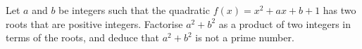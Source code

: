 Let $a$ and $b$ be integers such that the quadratic $f(x)=x^2+ax+b+1$ has two roots that are positive integers. Factorise $a^2+b^2$ as a product of two integers in terms of the roots, and deduce that $a^2+b^2$ is not a prime number.

